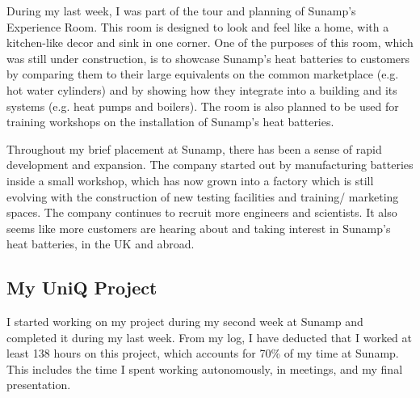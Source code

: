 During my last week, I was part of the tour and planning of Sunamp's Experience Room.
This room is designed to look and feel like a home, with a kitchen-like decor and sink in one corner.
One of the purposes of this room, which was still under construction, is to showcase Sunamp's heat batteries to customers by comparing them to their large equivalents on the common marketplace (e.g. hot water cylinders) and by showing how they integrate into a building and its systems (e.g. heat pumps
and boilers).
The room is also planned to be used for training workshops on the installation of Sunamp's heat batteries.

Throughout my brief placement at Sunamp, there has been a sense of rapid development and expansion.
The company started out by manufacturing batteries inside a small workshop, which has now grown into a factory which is still evolving with the construction of new testing facilities and training/ marketing spaces.
The company continues to recruit more engineers and scientists.
It also seems like more customers are hearing about and taking interest in Sunamp's heat batteries, in the UK and abroad.






\subsection{My UniQ Project} \label{sec:sunamp_work}



I started working on my project during my second week at Sunamp and completed it during my last week.
From my log, I have deducted that I worked at least 138 hours on this project, which accounts for 70\% of my time at Sunamp.
This includes the time I spent working autonomously, in meetings, and my final presentation.

